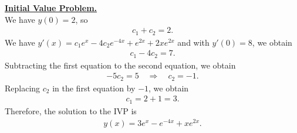 \documentclass[12pt]{article}
\newcommand{\Ra}{\Rightarrow}
\begin{document}
	\underline{\textbf{Initial Value Problem.}}\\
	We have $y(0) = 2$, so
		\begin{align*}
		c_1 + c_2 = 2 .
		\end{align*}
	We have $y' (x) = c_1 e^{x} - 4c_2 e^{-4x} + e^{2x} + 2xe^{2x}$ and with $y' (0) = 8$, we obtain
		\begin{align*}
		c_1 - 4c_2 = 7 .
		\end{align*}
	Subtracting the first equation to the second equation, we obtain
		\begin{align*}
		-5c_2 = 5 \quad \Ra \quad c_2 = -1 .
		\end{align*}
	Replacing $c_2$ in the first equation by $-1$, we obtain
		\begin{align*}
		c_1 = 2 + 1 = 3 .
		\end{align*}
	Therefore, the solution to the IVP is
		\begin{align*}
		y(x) = 3e^{x} -  e^{-4x} + xe^{2x} .
		\end{align*}
		
	\newpage
	
\end{document}
